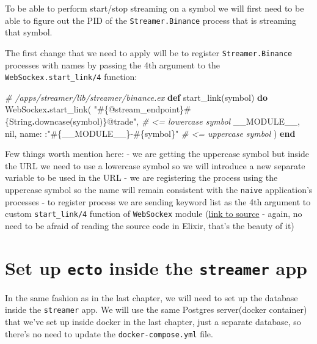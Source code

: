 \documentclass[
  oneside]{book}
\newenvironment{Shaded}{\begin{snugshade}}{\end{snugshade}}
\newcommand{\CommentTok}[1]{\textcolor[rgb]{0.56,0.35,0.01}{\textit{#1}}}
\newcommand{\ConstantTok}[1]{\textcolor[rgb]{0.00,0.00,0.00}{#1}}
\newcommand{\KeywordTok}[1]{\textcolor[rgb]{0.13,0.29,0.53}{\textbf{#1}}}
\newcommand{\NormalTok}[1]{#1}
\newcommand{\OperatorTok}[1]{\textcolor[rgb]{0.81,0.36,0.00}{\textbf{#1}}}
\newcommand{\OtherTok}[1]{\textcolor[rgb]{0.56,0.35,0.01}{#1}}
\newcommand{\StringTok}[1]{\textcolor[rgb]{0.31,0.60,0.02}{#1}}
\newcommand{\VariableTok}[1]{\textcolor[rgb]{0.00,0.00,0.00}{#1}}
\begin{document}
To be able to perform start/stop streaming on a symbol we will first need to be able to figure out the PID of the \texttt{Streamer.Binance} process that is streaming that symbol.

The first change that we need to apply will be to register \texttt{Streamer.Binance} processes with names by passing the 4th argument to the \texttt{WebSockex.start\_link/4} function:

\begin{Shaded}
\begin{Highlighting}[]
  \CommentTok{\# /apps/streamer/lib/streamer/binance.ex}
  \KeywordTok{def}\NormalTok{ start\_link(symbol) }\KeywordTok{do}
    \ConstantTok{WebSockex}\OperatorTok{.}\NormalTok{start\_link(}
      \StringTok{"}\OtherTok{\#\{@stream\_endpoint\}\#\{}\ConstantTok{String}\OperatorTok{.}\NormalTok{downcase(symbol)}\OtherTok{\}}\StringTok{@trade"}\NormalTok{, }\CommentTok{\# \textless{}= lowercase symbol}
      \ConstantTok{\_\_MODULE\_\_}\NormalTok{,}
      \ConstantTok{nil}\NormalTok{,}
      \VariableTok{name:}\NormalTok{ :}\StringTok{"}\OtherTok{\#\{}\ConstantTok{\_\_MODULE\_\_}\OtherTok{\}}\StringTok{{-}}\OtherTok{\#\{}\NormalTok{symbol}\OtherTok{\}}\StringTok{"} \CommentTok{\# \textless{}= uppercase symbol}
\NormalTok{    )}
  \KeywordTok{end}
\end{Highlighting}
\end{Shaded}

Few things worth mention here:
- we are getting the uppercase symbol but inside the URL we need to use a lowercase symbol so we will introduce a new separate variable to be used in the URL
- we are registering the process using the uppercase symbol so the name will remain consistent with the \texttt{naive} application's processes
- to register process we are sending keyword list as the 4th argument to custom \texttt{start\_link/4} function of \texttt{WebSockex} module (\href{https://github.com/Azolo/websockex/blob/master/lib/websockex.ex\#L376}{link to source} - again, no need to be afraid of reading the source code in Elixir, that's the beauty of it)

\hypertarget{set-up-ecto-inside-the-streamer-app}{%
\section{\texorpdfstring{Set up \texttt{ecto} inside the \texttt{streamer} app}{Set up ecto inside the streamer app}}\label{set-up-ecto-inside-the-streamer-app}}

In the same fashion as in the last chapter, we will need to set up the database inside the \texttt{streamer} app. We will use the same Postgres server(docker container) that we've set up inside docker in the last chapter, just a separate database, so there's no need to update the \texttt{docker-compose.yml} file.
\end{document}
